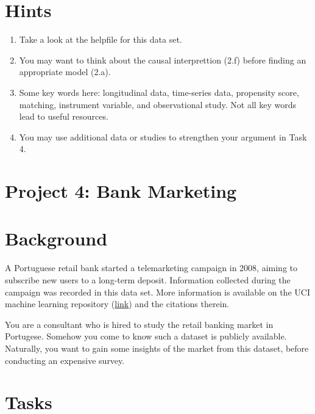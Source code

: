 \documentclass[12pt,]{book}
\providecommand{\tightlist}{%
  \setlength{\itemsep}{0pt}\setlength{\parskip}{0pt}}
\begin{document}
\section{Hints}\label{hints}

\begin{enumerate}
\def\labelenumi{\arabic{enumi}.}
\tightlist
\item
  Take a look at the helpfile for this data set.
\item
  You may want to think about the causal interprettion (2.f) before
  finding an appropriate model (2.a).
\item
  Some key words here: longitudinal data, time-series data, propensity
  score, matching, instrument variable, and observational study. Not all
  key words lead to useful resources.
\item
  You may use additional data or studies to strengthen your argument in
  Task 4.
\end{enumerate}

\section{Project 4: Bank Marketing}\label{project-4-bank-marketing}

\section{Background}\label{background-3}

A Portuguese retail bank started a telemarketing campaign in 2008,
aiming to subscribe new users to a long-term deposit. Information
collected during the campaign was recorded in this data set. More
information is available on the UCI machine learning repository
(\href{https://archive.ics.uci.edu/ml/datasets/Bank+Marketing\#}{link})
and the citations therein.

You are a consultant who is hired to study the retail banking market in
Portugese. Somehow you come to know such a dataset is publicly
available. Naturally, you want to gain some insights of the market from
this dataset, before conducting an expensive survey.

\section{Tasks}\label{tasks-3}
\end{document}
